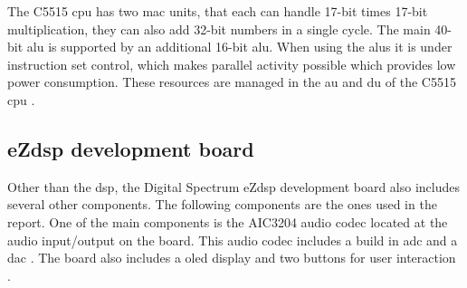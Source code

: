 The C5515 \gls{cpu} has two \gls{mac} units, that each can handle 17-bit times 17-bit multiplication, they can also add 32-bit numbers in a single cycle. The main 40-bit \gls{alu} is supported by an additional 16-bit \gls{alu}. When using the \gls{alu}s it is under instruction set control, which makes parallel activity possible which provides low power consumption. These resources are managed in the \gls{au} and \gls{du} of the C5515 \gls{cpu} \citep{dsp}.

\subsection{eZdsp development board}
Other than the \gls{dsp}, the Digital Spectrum eZdsp development board also includes several other components. The following components are the ones used in the report. One of the main components is the AIC3204 audio \gls{codec} located at the audio input/output on the board. This audio \gls{codec}  includes a build in \gls{adc} and a \gls{dac} \citep{dspadc}. The board also includes a \gls{oled} display and two buttons for user interaction \citep{ezdsp}.










